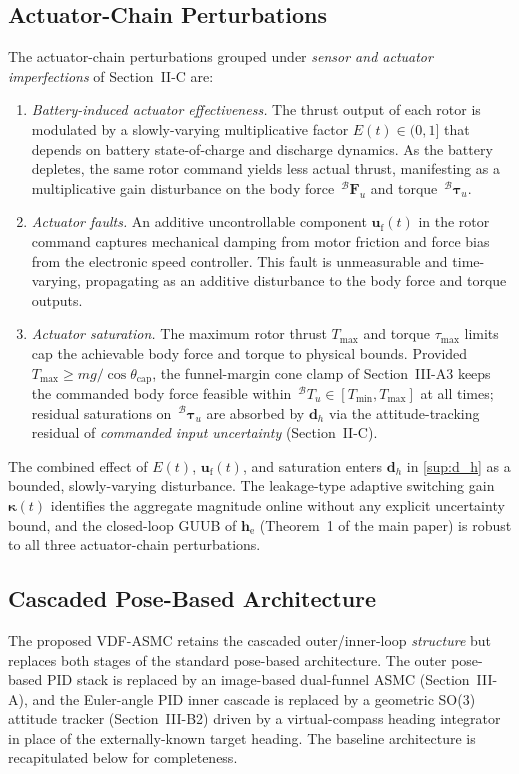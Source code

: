 \documentclass[10pt,journal]{IEEEtran}
\begin{document}
\subsection{Actuator-Chain Perturbations}
\label{sup:uncertainty_sources}
The actuator-chain perturbations grouped under \emph{sensor and actuator imperfections} of Section~II-C are:
\begin{enumerate}
    \item \emph{Battery-induced actuator effectiveness.} The thrust output of each rotor is modulated by a slowly-varying multiplicative factor $E(t)\in(0,1]$ that depends on battery state-of-charge and discharge dynamics. As the battery depletes, the same rotor command yields less actual thrust, manifesting as a multiplicative gain disturbance on the body force $\,^\mathcal{B}\boldsymbol{F}_u$ and torque $\,^\mathcal{B}\boldsymbol{\tau}_u$.
    \item \emph{Actuator faults.} An additive uncontrollable component $\boldsymbol{u}_\text{f}(t)$ in the rotor command captures mechanical damping from motor friction and force bias from the electronic speed controller. This fault is unmeasurable and time-varying, propagating as an additive disturbance to the body force and torque outputs.
    \item \emph{Actuator saturation.} The maximum rotor thrust $T_\text{max}$ and torque $\tau_\text{max}$ limits cap the achievable body force and torque to physical bounds. Provided $T_\text{max}\ge mg/\cos\theta_\text{cap}$, the funnel-margin cone clamp of Section~III-A3 keeps the commanded body force feasible within $\,^\mathcal{B}T_u\in[T_\text{min},T_\text{max}]$ at all times; residual saturations on $\,^\mathcal{B}\boldsymbol{\tau}_u$ are absorbed by $\boldsymbol{d}_h$ via the attitude-tracking residual of \emph{commanded input uncertainty} (Section~II-C).
\end{enumerate}

The combined effect of $E(t)$, $\boldsymbol{u}_\text{f}(t)$, and saturation enters $\boldsymbol{d}_h$ in \eqref{sup:d_h} as a bounded, slowly-varying disturbance. The leakage-type adaptive switching gain $\boldsymbol{\kappa}(t)$ identifies the aggregate magnitude online without any explicit uncertainty bound, and the closed-loop GUUB of $\boldsymbol{h}_\text{e}$ (Theorem~1 of the main paper) is robust to all three actuator-chain perturbations.

\subsection{Cascaded Pose-Based Architecture}
\label{sup:cascaded_baseline}
The proposed VDF-ASMC retains the cascaded outer/inner-loop \emph{structure} but replaces both stages of the standard pose-based architecture. The outer pose-based PID stack is replaced by an image-based dual-funnel ASMC (Section~III-A), and the Euler-angle PID inner cascade is replaced by a geometric SO(3) attitude tracker (Section~III-B2) driven by a virtual-compass heading integrator in place of the externally-known target heading. The baseline architecture is recapitulated below for completeness.
\end{document}

